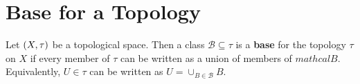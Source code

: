 \documentclass[../main-sheet.tex]{subfiles}
\begin{document}
\chapter{Base for a Topology}
\begin{defn}
    Let \((X, \tau)\) be a topological space. Then a class \(\mathcal{B}\subseteq \tau\) is a \textbf{base} for the topology \(\tau\) on \(X\) if every member of \(\tau\) can be written as a union of members of \(mathcal{B}\). Equivalently, \(U\in \tau\) can be written as \(U=\cup_{B\in\mathcal{B}}B\).
\end{defn}
\end{document}
